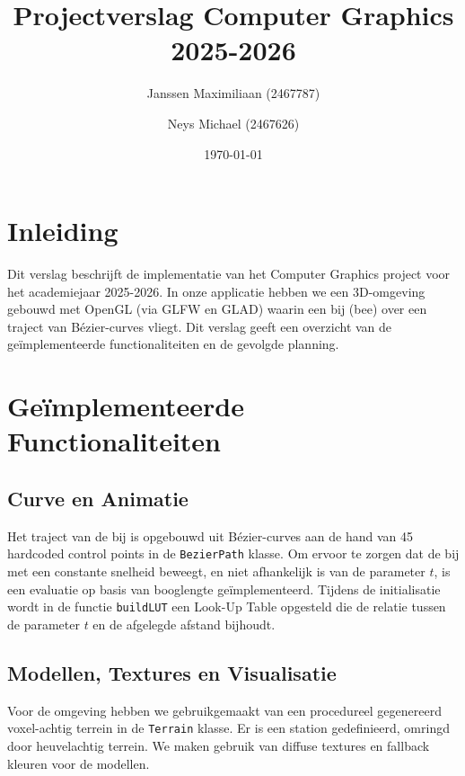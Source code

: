 \documentclass[11pt,a4paper]{article}
\title{\textbf{Projectverslag Computer Graphics 2025-2026}}
\author{Janssen Maximiliaan (2467787) \and Neys Michael (2467626)}
\date{\today}
\begin{document}
\maketitle

\section{Inleiding}
Dit verslag beschrijft de implementatie van het Computer Graphics project voor het academiejaar 2025-2026. In onze applicatie hebben we een 3D-omgeving gebouwd met OpenGL (via GLFW en GLAD) waarin een bij (bee) over een traject van Bézier-curves vliegt. Dit verslag geeft een overzicht van de geïmplementeerde functionaliteiten en de gevolgde planning.

\section{Geïmplementeerde Functionaliteiten}

\subsection{Curve en Animatie}
Het traject van de bij is opgebouwd uit Bézier-curves aan de hand van 45 hardcoded control points in de \texttt{BezierPath} klasse. Om ervoor te zorgen dat de bij met een constante snelheid beweegt, en niet afhankelijk is van de parameter $t$, is een evaluatie op basis van booglengte geïmplementeerd. Tijdens de initialisatie wordt in de functie \texttt{buildLUT} een Look-Up Table opgesteld die de relatie tussen de parameter $t$ en de afgelegde afstand bijhoudt.

\subsection{Modellen, Textures en Visualisatie}
Voor de omgeving hebben we gebruikgemaakt van een procedureel gegenereerd voxel-achtig terrein in de \texttt{Terrain} klasse. Er is een station gedefinieerd, omringd door heuvelachtig terrein. We maken gebruik van diffuse textures en fallback kleuren voor de modellen. 
\end{document}
